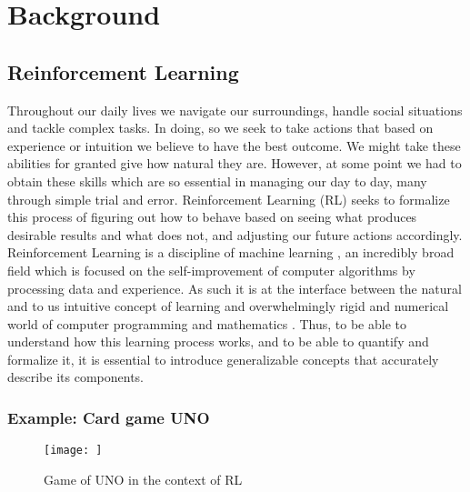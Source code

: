 \chapter{Background}\label{chap:theory}
\section{Reinforcement Learning}\label{sec:RL}

Throughout our daily lives we navigate our surroundings, handle social situations and tackle complex tasks. In doing, so we seek to take actions that based on experience or intuition we believe to have the best outcome. We might take these abilities for granted give how natural they are. However, at some point we had to obtain these skills which are so essential in managing our day to day, many through simple trial and error. Reinforcement Learning (RL) seeks to formalize this process of figuring out how to behave based on seeing what produces desirable results and what does not, and adjusting our future actions accordingly. 
Reinforcement Learning is a discipline of machine learning \cite[p. 1]{sutton_reinforcement_2018} , an incredibly broad field which is focused on the self-improvement of computer algorithms by processing data and experience. 
As such it is at the interface between the natural and to us intuitive concept of learning and overwhelmingly rigid and numerical world of computer programming and mathematics \cite[p. 4]{sutton_reinforcement_2018}. Thus, to be able to understand how this learning process works, and to be able to quantify and formalize it, it is essential to introduce generalizable concepts that accurately describe its components. 

\subsection*{Example: Card game UNO}\label{subsec:UNO}

\begin{figure}[h!]
    \centering
    \texttt{[image: ]}
    \caption{Game of UNO in the context of RL}
    \label{fig:uno_game}
\end{figure}


